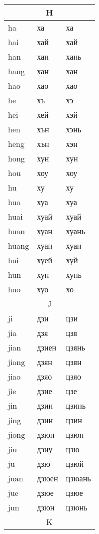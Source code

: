 \begin{longtable}{|l|l|l|}
\multicolumn{3}{|c|}{H} \\ \hline
ha &ха &ха
\\hai &хай &хай
\\han &хан &хань
\\hang &хан &хан
\\hao &хао &хао
\\he &хъ &хэ
\\hei &хей &хэй
\\hen &хън &хэнь
\\heng &хън &хэн
\\hong &хун &хун
\\hou &хоу &хоу
\\hu &ху &ху
\\hua &хуа &хуа
\\huai &хуай &хуай
\\huan &хуан &хуань
\\huang &хуан &хуан
\\hui &хуей &хуй
\\hun &хун &хунь
\\huo &хуо &хо
\\

\hline

\multicolumn{3}{|c|}{J} \\ \hline
ji &дзи &цзи
\\jia &дзя &цзя
\\jian &дзиен &цзянь
\\jiang &дзян &цзян
\\jiao &дзяо &цзяо
\\jie &дзие &цзе
\\jin &дзин &цзинь
\\jing &дзин &цзин
\\jiong &дзюн &цзюн
\\jiu &дзиу &цзю
\\ju &дзю &цзюй
\\juan &дзюен &цзюань
\\jue &дзюе &цзюе
\\jun &дзюн &цзюнь
\\

\hline

\multicolumn{3}{|c|}{K} \\ \hline


\end{longtable}
